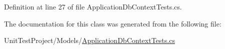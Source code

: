 Definition at line 27 of file Application\+Db\+Context\+Tests.\+cs.



The documentation for this class was generated from the following file\+:\begin{DoxyCompactItemize}
\item 
Unit\+Test\+Project/\+Models/\mbox{\hyperlink{_application_db_context_tests_8cs}{Application\+Db\+Context\+Tests.\+cs}}\end{DoxyCompactItemize}
